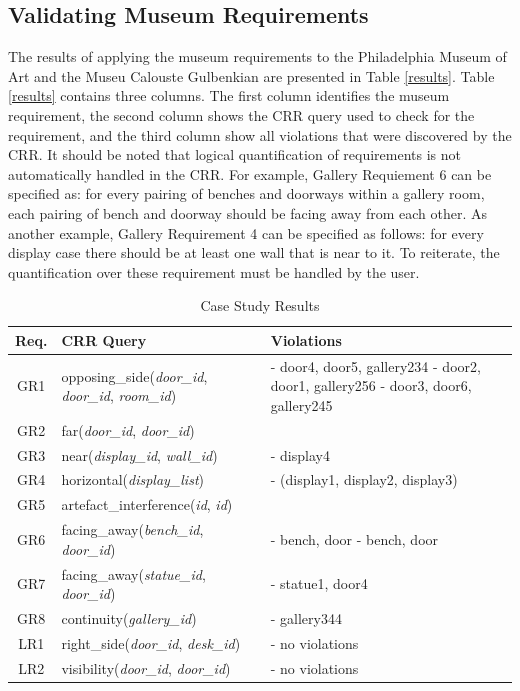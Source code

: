 \documentclass[12pt]{ucthesis}
\begin{document}
\subsection{Validating Museum Requirements}
The results of applying the museum requirements to the Philadelphia Museum of Art and the Museu Calouste Gulbenkian are presented in Table \ref{results}. Table \ref{results} contains three columns. The first column identifies the museum requirement, the second column shows the CRR query used to check for the requirement, and the third column show all violations that were discovered by the CRR. It should be noted that logical quantification of requirements is not automatically handled in the CRR. For example, Gallery Requiement 6 can be specified as: for every pairing of benches and doorways within a gallery room, each pairing of bench and doorway should be facing away from each other. As another example, Gallery Requirement 4 can be specified as follows: for every display case there should be at least one wall that is near to it. To reiterate, the quantification over these requirement must be handled by the user.


\begin{table}[H]\label{results}
  \begin{center}
  \begin{tabular}{ | c | p{7.5cm} | p{6cm} |}
    \hline
    Req. & CRR Query & Violations\\ \hline
    GR1 & opposing\_side(\emph{door\_id}, \emph{door\_id}, \emph{room\_id}) & - door4, door5, gallery234 
    													\newline - door2, door1, gallery256 
    													\newline - door3, door6, gallery245 \\ \hline
    GR2 & far(\emph{door\_id}, \emph{door\_id})  &  \\ \hline
    GR3 & near(\emph{display\_id}, \emph{wall\_id}) & - display4 \\ \hline
    GR4 & horizontal(\emph{display\_list}) & - (display1, display2, display3) \\ \hline
    GR5 & artefact\_interference(\emph{id}, \emph{id}) &  \\ \hline
    GR6 & facing\_away(\emph{bench\_id}, \emph{door\_id}) & - bench, door
                               \newline - bench, door \\ \hline
    GR7 & facing\_away(\emph{statue\_id}, \emph{door\_id}) & - statue1, door4 \\ \hline
    GR8 & continuity(\emph{gallery\_id}) &  - gallery344 \\ \hline
    LR1 & right\_side(\emph{door\_id}, \emph{desk\_id})& - no violations \\ \hline
    LR2 & visibility(\emph{door\_id}, \emph{door\_id})& - no violations\\
    \hline
  \end{tabular}
  \end{center}
\caption{Case Study Results}
\label{spatial abstractions}
\end{table} 
\end{document}

